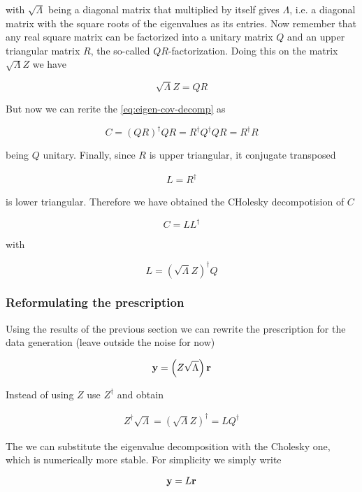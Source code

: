 with $\sqrt{\Lambda}$ being a diagonal matrix that multiplied by itself gives $\Lambda$, i.e. a diagonal matrix with the square roots of the eigenvalues as its entries. Now remember that any real square matrix can be factorized into a unitary matrix $Q$ and an upper triangular matrix $R$, the so-called $QR$-factorization. Doing this on the matrix $\sqrt{\Lambda} Z$ we have

\begin{equation}
\sqrt{\Lambda} Z = Q R
\end{equation}

But now we can rerite the \eqref{eq:eigen-cov-decomp} as

\[
C = (QR)^{\dagger} QR = R^{\dagger} Q^{\dagger} Q R = R^{\dagger} R 
\]

being $Q$ unitary. Finally, since $R$ is upper triangular, it conjugate transposed 

\begin{align*}
L = R^{\dagger}
\end{align*}
 
is lower triangular. Therefore we have obtained the CHolesky decompotision of $C$

\begin{equation}
 C = L L^{\dagger}
\end{equation} 

with

\[
L = \left ( \sqrt{\Lambda} Z \right )^{\dagger} Q
\]

\subsubsection{Reformulating the prescription}

Using the results of the previous section we can rewrite the prescription for the data generation (leave outside the noise for now)

\begin{equation}
\mathbf{y} = \left ( Z \sqrt{\Lambda} \right ) \mathbf{r} 
\end{equation}

Instead of using $Z$ use $Z^{\dagger}$ and obtain 

\begin{align*}
Z^{\dagger} \sqrt{\Lambda} = \left ( \sqrt{\Lambda} Z\right )^{\dagger} = L Q^{\dagger}
\end{align*}

The we can substitute the eigenvalue decomposition with the Cholesky one, which is numerically more stable. For simplicity we simply write

\begin{equation}
\mathbf{y} = L \mathbf{r}
\end{equation}

